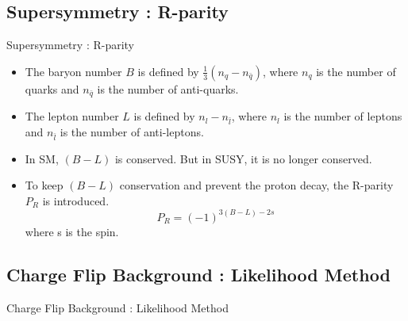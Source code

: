 \documentclass[mathserif,serif]{beamer}
\begin{document}
\subsection{Supersymmetry : R-parity}
\begin{frame}{Supersymmetry : R-parity}
\begin{itemize}
\item The baryon number $B$ is defined by $\frac{1}{3} (n_q - n_{\bar{q}})$, where $n_q$ is the number of quarks and $n_{\bar{q}}$ is the number of anti-quarks.
\item The lepton number $L$ is defined by $n_l - n_{\bar{l}}$, where $n_l$ is the number of leptons and $n_{\bar{l}}$ is the number of anti-leptons.
\item In SM, $(B-L)$ is conserved. But in SUSY, it is no longer conserved.
\item To keep $(B-L)$ conservation and prevent the proton decay, the R-parity $P_R$ is introduced.
\begin{equation*}
P_R = (-1)^{3(B-L)-2s}
\end{equation*}
where s is the spin.
\end{itemize}
\end{frame}

\subsection{Charge Flip Background : Likelihood Method}
\begin{frame}
\begin{center}
\huge
Charge Flip Background : Likelihood Method
\end{center}
\end{frame}
\end{document}
